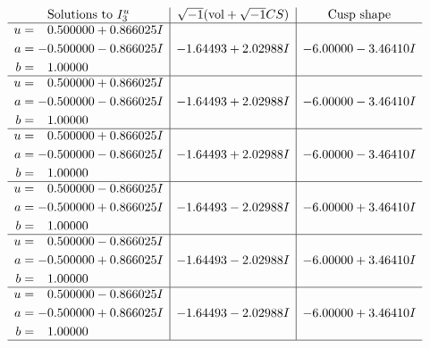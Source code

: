 \documentclass[1p]{elsarticle_modified}
\theoremstyle{definition}
\newcommand{\I}{\sqrt{-1}}
\begin{document}
$$\begin{array}{c|c|c}  
\text{Solutions to }I^u_{3}& \I (\text{vol} + \sqrt{-1}CS) & \text{Cusp shape}\\
 \hline 
\begin{aligned}
u &= \phantom{-}0.500000 + 0.866025 I \\
a &= -0.500000 - 0.866025 I \\
b &= \phantom{-}1.00000\phantom{ +0.000000I}\end{aligned}
 & -1.64493 + 2.02988 I & -6.00000 - 3.46410 I \\ \hline\begin{aligned}
u &= \phantom{-}0.500000 + 0.866025 I \\
a &= -0.500000 - 0.866025 I \\
b &= \phantom{-}1.00000\phantom{ +0.000000I}\end{aligned}
 & -1.64493 + 2.02988 I & -6.00000 - 3.46410 I \\ \hline\begin{aligned}
u &= \phantom{-}0.500000 + 0.866025 I \\
a &= -0.500000 - 0.866025 I \\
b &= \phantom{-}1.00000\phantom{ +0.000000I}\end{aligned}
 & -1.64493 + 2.02988 I & -6.00000 - 3.46410 I \\ \hline\begin{aligned}
u &= \phantom{-}0.500000 - 0.866025 I \\
a &= -0.500000 + 0.866025 I \\
b &= \phantom{-}1.00000\phantom{ +0.000000I}\end{aligned}
 & -1.64493 - 2.02988 I & -6.00000 + 3.46410 I \\ \hline\begin{aligned}
u &= \phantom{-}0.500000 - 0.866025 I \\
a &= -0.500000 + 0.866025 I \\
b &= \phantom{-}1.00000\phantom{ +0.000000I}\end{aligned}
 & -1.64493 - 2.02988 I & -6.00000 + 3.46410 I \\ \hline\begin{aligned}
u &= \phantom{-}0.500000 - 0.866025 I \\
a &= -0.500000 + 0.866025 I \\
b &= \phantom{-}1.00000\phantom{ +0.000000I}\end{aligned}
 & -1.64493 - 2.02988 I & -6.00000 + 3.46410 I\\
 \hline 
 \end{array}$$\newpage
\end{document}
